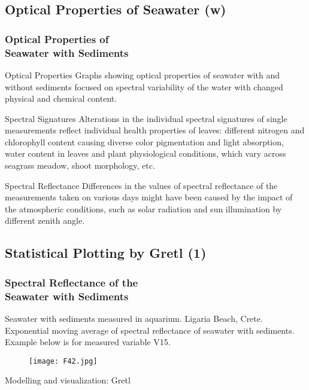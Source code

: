 \documentclass[pdflatex,compress,9pt,
	xcolor={dvipsnames,dvipsnames,svgnames,x11names,table},
	hyperref={colorlinks = true,breaklinks = true, urlcolor = NavyBlue, breaklinks = true}]{beamer}
\begin{document}
\subsection{Optical Properties of Seawater (w)}
\begin{frame}\frametitle{Optical Properties of \\Seawater \alert{with} Sediments}

\begin{alertblock}{Optical Properties}
Graphs showing optical properties of seawater with and without sediments focused on spectral variability of the water with changed physical and chemical content.
\end{alertblock}

\begin{block}{Spectral Signatures}
Alterations in the individual spectral signatures of single measurements reflect individual health properties of leaves: different nitrogen and chlorophyll content causing diverse color pigmentation and light absorption, water content in leaves and plant physiological conditions, which vary across seagrass meadow, shoot morphology, etc.
\end{block}

\begin{examples}{Spectral Reflectance}
Differences in the values of spectral reflectance of the measurements taken on various days might have been caused by the impact of the atmospheric conditions, such as solar radiation and sun illumination by different zenith angle.
\end{examples}

\end{frame}

\subsection{Statistical Plotting by Gretl (1)}
\begin{frame}\frametitle{Spectral Reflectance of the \\Seawater \alert{with} Sediments}
Seawater with sediments measured in aquarium. Ligaria Beach, Crete. \\
Exponential moving average of spectral reflectance of seawater with sediments. Example below is for measured variable V15.
\begin{figure}[H]
	\centering
		\texttt{[image: F42.jpg]}
\end{figure}
\scriptsize{Modelling and visualization: \ac{Gretl}}
\end{frame}
\end{document}
